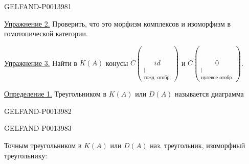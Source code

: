 \begin{GelfandAdjacentEvidence}{GELFAND-P001398}{1}

\uline{Упражнение 2.} Проверить, что это морфизм комплексов и изоморфизм в гомотопической категории.

\uline{Упражнение 3.} Найти в \(K(A)\) конусы
\(C(\underset{\substack{\vert\\\text{тожд. отобр.}}}{id})\)
и
\(C(\underset{\substack{\vert\\\text{нулевое отобр.}}}{0})\).

\uline{Определение 1.} Треугольником в \(K(A)\) или \(D(A)\) называется диаграмма

\end{GelfandAdjacentEvidence}
\begin{GelfandAdjacentEvidence}{GELFAND-P001398}{2}


\end{GelfandAdjacentEvidence}
\begin{GelfandAdjacentEvidence}{GELFAND-P001398}{3}


 Точным треугольником в \(K(A)\) или \(D(A)\) наз. треугольник, изоморфный треугольнику:

\end{GelfandAdjacentEvidence}



